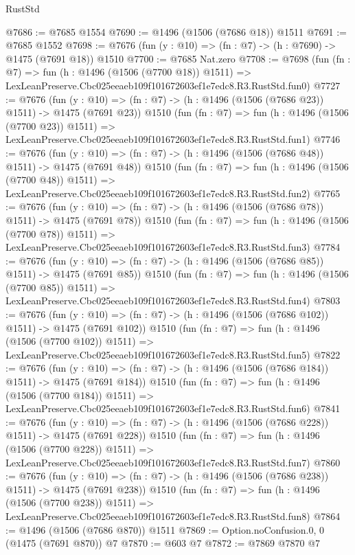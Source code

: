 \begin{lexlean}{RustStd}
\begin{coremodule}
@7686 := @7685 @1554
@7690 := @1496 (@1506 (@7686 @18)) @1511
@7691 := @7685 @1552
@7698 := @7676 (fun (y : @10) => (fn : @7) -> (h : @7690) -> @1475 (@7691 @18)) @1510
@7700 := @7685 Nat.zero
@7708 := @7698
    (fun (fn : @7) =>
    fun (h : @1496 (@1506 (@7700 @18)) @1511) =>
    LexLeanPreserve.Cbc025eeaeb109f101672603ef1e7edc8.R3.RustStd.fun0)
@7727 := @7676
    (fun (y : @10) => (fn : @7) -> (h : @1496 (@1506 (@7686 @23)) @1511) -> @1475 (@7691 @23))
    @1510
    (fun (fn : @7) =>
    fun (h : @1496 (@1506 (@7700 @23)) @1511) =>
    LexLeanPreserve.Cbc025eeaeb109f101672603ef1e7edc8.R3.RustStd.fun1)
@7746 := @7676
    (fun (y : @10) => (fn : @7) -> (h : @1496 (@1506 (@7686 @48)) @1511) -> @1475 (@7691 @48))
    @1510
    (fun (fn : @7) =>
    fun (h : @1496 (@1506 (@7700 @48)) @1511) =>
    LexLeanPreserve.Cbc025eeaeb109f101672603ef1e7edc8.R3.RustStd.fun2)
@7765 := @7676
    (fun (y : @10) => (fn : @7) -> (h : @1496 (@1506 (@7686 @78)) @1511) -> @1475 (@7691 @78))
    @1510
    (fun (fn : @7) =>
    fun (h : @1496 (@1506 (@7700 @78)) @1511) =>
    LexLeanPreserve.Cbc025eeaeb109f101672603ef1e7edc8.R3.RustStd.fun3)
@7784 := @7676
    (fun (y : @10) => (fn : @7) -> (h : @1496 (@1506 (@7686 @85)) @1511) -> @1475 (@7691 @85))
    @1510
    (fun (fn : @7) =>
    fun (h : @1496 (@1506 (@7700 @85)) @1511) =>
    LexLeanPreserve.Cbc025eeaeb109f101672603ef1e7edc8.R3.RustStd.fun4)
@7803 := @7676
    (fun (y : @10) => (fn : @7) -> (h : @1496 (@1506 (@7686 @102)) @1511) -> @1475 (@7691 @102))
    @1510
    (fun (fn : @7) =>
    fun (h : @1496 (@1506 (@7700 @102)) @1511) =>
    LexLeanPreserve.Cbc025eeaeb109f101672603ef1e7edc8.R3.RustStd.fun5)
@7822 := @7676
    (fun (y : @10) => (fn : @7) -> (h : @1496 (@1506 (@7686 @184)) @1511) -> @1475 (@7691 @184))
    @1510
    (fun (fn : @7) =>
    fun (h : @1496 (@1506 (@7700 @184)) @1511) =>
    LexLeanPreserve.Cbc025eeaeb109f101672603ef1e7edc8.R3.RustStd.fun6)
@7841 := @7676
    (fun (y : @10) => (fn : @7) -> (h : @1496 (@1506 (@7686 @228)) @1511) -> @1475 (@7691 @228))
    @1510
    (fun (fn : @7) =>
    fun (h : @1496 (@1506 (@7700 @228)) @1511) =>
    LexLeanPreserve.Cbc025eeaeb109f101672603ef1e7edc8.R3.RustStd.fun7)
@7860 := @7676
    (fun (y : @10) => (fn : @7) -> (h : @1496 (@1506 (@7686 @238)) @1511) -> @1475 (@7691 @238))
    @1510
    (fun (fn : @7) =>
    fun (h : @1496 (@1506 (@7700 @238)) @1511) =>
    LexLeanPreserve.Cbc025eeaeb109f101672603ef1e7edc8.R3.RustStd.fun8)
@7864 := @1496 (@1506 (@7686 @870)) @1511
@7869 := Option.noConfusion.{0, 0} (@1475 (@7691 @870)) @7
@7870 := @603 @7
@7872 := @7869 @7870 @7

\end{coremodule}
\end{lexlean}
